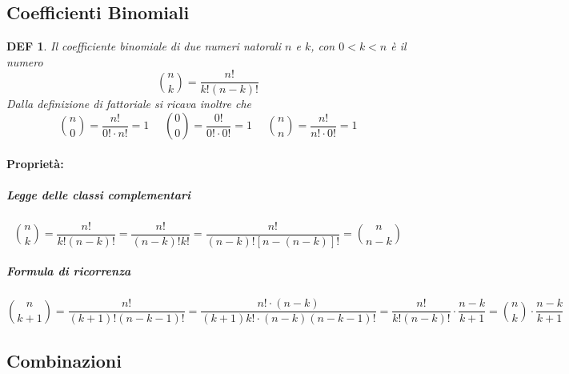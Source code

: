 \documentclass{article}     %
\newtheorem*{definition}{DEF}
\begin{document}
        \subsection{Coefficienti Binomiali}
            \begin{definition}
                Il coefficiente binomiale di due numeri natorali $n$ e $k$, con $0<k<n$ è il numero  \[\binom{n}{k}=\frac{n!}{k!(n-k)!}\]
                Dalla definizione di fattoriale si ricava inoltre che
                \[\binom{n}{0}=\frac{n!}{0!\cdot n!}=1 ~~~~~~ \binom{0}{0}=\frac{0!}{0!\cdot 0!}=1 ~~~~~~ \binom{n}{n}=\frac{n!}{n!\cdot 0!}=1\]
            \end{definition}
           
            
            \paragraph{Proprietà:}
                    \subparagraph{Legge delle classi complementari}
                        \[\binom{n}{k}=\frac{n!}{k!(n-k)!}=\frac{n!}{(n-k)!k!}=\frac{n!}{(n-k)![n-(n-k)]!}=\binom{n}{n-k}\]
                    \subparagraph{Formula di ricorrenza}
                        \[\binom{n}{k+1}=\frac{n!}{(k+1)!(n-k-1)!}=\frac{n!\cdot(n-k)}{(k+1)k!\cdot(n-k)(n-k-1)!}=\frac{n!}{k!(n-k)!}\cdot \frac{n-k}{k+1}=\binom{n}{k}\cdot \frac{n-k}{k+1}\]
        
        \subsection{Combinazioni}
\end{document}
